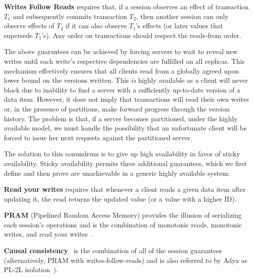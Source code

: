 \vspace{.5em}\noindent\textbf{{Writes Follow Reads}} requires that, if
a session observes an effect of transaction $T_1$ and subsequently
commits transaction $T_2$, then another session can only observe
effects of $T_2$ if it can also observe $T_1$'s effects (or later
values that supersede $T_1$'s).  Any order on transactions should
respect the reads-from order.\vspace{.5em}

The above guarantees can be achieved by forcing servers to wait to
reveal new writes until each write's respective dependencies are
fulfilled on all replicas. This mechanism effectively ensures that all
clients read from a globally agreed upon lower bound on the versions
written. This \textit{is} highly available as a client
will never block due to inability to find a server with a sufficiently
up-to-date version of a data item. However, it does not imply that
transactions will read their own writes or, in the presence of
partitions, make forward progress through the version history. The
problem is that, if a server becomes partitioned, under the highly
available model, we must handle the possibility that an unfortunate
client will be forced to issue her next requests against the
partitioned server.

The solution to this conundrum is to give up high availability in
favor of sticky availability. Sticky availability permits three
additional guarantees, which we first define and then prove are
unachievable in a generic highly available system:

\vspace{.5em}\noindent\textbf{{Read your writes}} requires
that whenever a client reads a given data item after updating it, the
read returns the updated value (or a value with a higher ID).

\vspace{.5em}\noindent\textbf{{PRAM}} (Pipelined Random Access
Memory) provides the illusion of serializing each session's operations
and is the combination of monotonic reads, monotonic writes, and read
your writes~\cite{herlihy-art}.

\vspace{.5em}\noindent\textbf{{Causal
    consistency}}~\cite{causalmemory} is the combination of all of the
session guarantees~\cite{sessiontocausal} (alternatively, PRAM with
writes-follow-reads) and is also referred to by Adya as PL-2L
isolation~\cite{adya}).\vspace{.5em}


